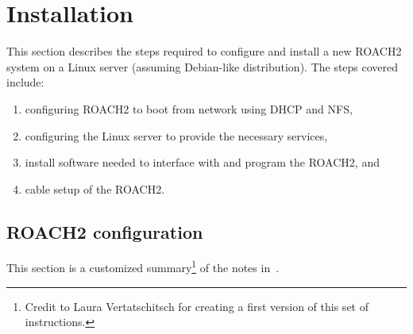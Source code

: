 \documentclass[a4paper,10pt]{article}
\begin{document}
\section{Installation}
\label{sec:installation}
This section describes the steps required to configure and install a 
new ROACH2 system on a Linux server (assuming Debian-like distribution).
The steps covered include:
\begin{enumerate}
	\item configuring ROACH2 to boot from network using DHCP and NFS,
	\item configuring the Linux server to provide the necessary services,
	\item install software needed to interface with and program the ROACH2, and
	\item cable setup of the ROACH2.
\end{enumerate}

\subsection{ROACH2 configuration}
\label{sec:r2conf}
This section is a customized summary\footnote{Credit to Laura 
Vertatschitsch for creating a first version of this set of 
instructions.} of the notes in~\cite{caspernfs}.
\end{document}
